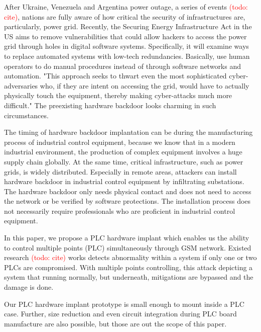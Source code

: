 After Ukraine, Venezuela and Argentina power outage, a series of events \textcolor{red}{(todo: cite)}, nations are fully aware of how critical the security of infrastructures are, particularly, power grid. Recently, the Securing Energy Infrastructure Act in the US aims to remove vulnerabilities that could allow hackers to access the power grid through holes in digital software systems. Specifically, it will examine ways to replace automated systems with low-tech redundancies. Basically, use human operators to do manual procedures instead of through software networks and automation. "This approach seeks to thwart even the most sophisticated cyber-adversaries who, if they are intent on accessing the grid, would have to actually physically touch the equipment, thereby making cyber-attacks much more difficult." The preexisting hardware backdoor looks charming in such circumstances.

The timing of hardware backdoor implantation can be during the manufacturing process of industrial control equipment, because we know that in a modern industrial environment, the production of complex equipment involves a huge supply chain globally. At the same time, critical infrastructure, such as power grids, is widely distributed. Especially in remote areas, attackers can install hardware backdoor in industrial control equipment by infiltrating substations. The hardware backdoor only needs physical contact and does not need to access the network or be verified by software protections. The installation process does not necessarily require professionals who are proficient in industrial control equipment.

In this paper, we propose a PLC hardware implant which enables us the ability to control multiple points (PLC) simultaneously through GSM network. Existed research \textcolor{red}{(todo: cite)} works detects abnormality within a system if only one or two PLCs are compromised. With multiple points controlling, this attack depicting a system that running normally, but underneath, mitigations are bypassed and the damage is done.

Our PLC hardware implant prototype is small enough to mount inside a PLC case. Further, size reduction and even circuit integration during PLC board manufacture are also possible, but those are out the scope of this paper.


